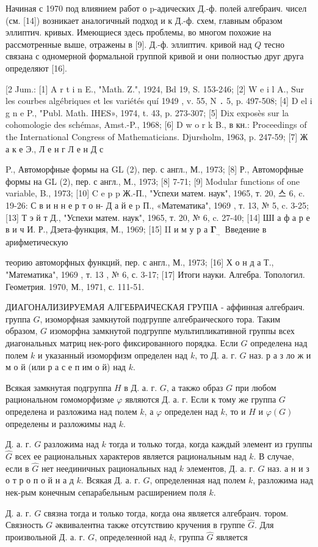 \documentclass[10pt]{article}
\begin{document}
Начиная с 1970 под влиянием работ о p-адических Д.-ф. полей алгебраич. чисел (см. [14]) возникает аналогичный подход и к Д.-ф. схем, главным образом эллиптич. кривых. Имеющиеся здесь проблемы, во многом похожие на рассмотренные выше, отражены в [9]. Д.-ф. эллиптич. кривой над $Q$ тесно связана с одномерной формальной группой кривой и они полностью друг друга определяют [16].



[2 Jum.: [1] A r t i n E., "Math. Z.", 1924, Bd 19, S. 153-246; [2] W e i l A., Sur les courbes algébriques et les variétés quí 1949 , v. 55, N ․ 5, p. 497-508; [4] D el i g n e P., "Publ. Math. IHES», 1974, t. 43, p. 273-307; [5] Dix exposès sur la cohomologie des schémas, Amst.-P., 1968; [6] D w o r k B., в кн.: Proceedings of the International Congress of Mathematicians. Djursholm, 1963, p. 247-59; [7] Ж а к е Э., Л е н г Л е н Д с

P., Автоморфные формы на GL (2), пер. с англ., М., 1973; [8] Р., Автоморфные формы на GL (2), пер. с англ., М., 1973; [8] 7-71; [9] Modular functions of one variable, B., 1973; [10] C e p p Ж.-П., "Успехи матем. наук", 1965, т. 20, 스 6, c. 19-26: С в и н н е р т о н- Д а й е p П., «Математика", 1969 , т. 13, № 5, c. 3-25; [13] Т э й т Д., "Успехи матем. наук", 1965, т. 20, № 6, c. 27-40; [14] ШІ а ф а р е в и ч И. Р., Дзета-функция, М., 1969; [15] II и м у р а $\boldsymbol{\Gamma}_{\text {., }}$ Введение в арифметическую

теорию автоморфных функций, пер. с англ., М., 1973; [16] Х о н д а Т., "Математика", 1969 , т. 13 , № 6, с. 3-17; [17] Итоги науки. Алгебра. Топологил. Геометрия. 1970, М., 1971, с. 111-51.



ДИАГОНАЛИЗИРУЕМАЯ АЛГЕБРАИЧЕСКАЯ ГРУПІА - аффинная алгебраич. группа $G$, изоморфная замкнутой подгруппе алгебраического тора. Таким образом, $G$ изоморфна замкнутой подгруппе мультипликативной группы всех диагональных матриц нек-рого фиксированного порядка. Если $G$ определена над полем $k$ и указанный изоморфизм определен над $k$, то Д. а. г. $G$ наз. р а з ло ж и м о й (или р а с е п им о й) над $k$.



Всякая замкнутая подгруппа $H$ в Д. а. г. $G$, а такжо образ $G$ при любом рациональном гомоморфизме $\varphi$ являются Д. а. г. Если к тому же группа $G$ определена и разложима над полем $k$, а $\varphi$ определен над $k$, то и $H$ и $\varphi(G)$ определены и разложимы над $k$.



Д. а. г. $G$ разложима над $k$ тогда и только тогда, когда каждый элемент из группы $\widehat{G}$ всех ее рациональных характеров является рациональным над $k$. В случае, если в $\widehat{G}$ нет неединичных рациональных над $k$ элементов, Д. а. г. $G$ наз. а н и з о т р о п о й н а д $k$. Всякая Д. а. г. $G$, определенная над полем $k$, разложима над нек-рым конечным сепарабельным расширением поля $k$.



Д. а. г. $G$ связна тогда и только тогда, когда она является алгебраич. тором. Связность $G$ әквивалентна также отсутствию кручения в группе $\widehat{G}$. Для произвольной Д. а. г. $G$, определенной над $k$, группа $\widehat{G}$ является
\end{document}
